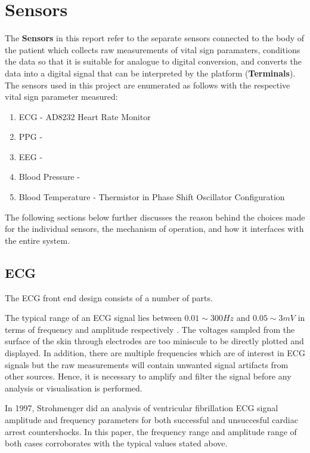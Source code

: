 \chapter{Sensors} 
\label{sensors}

The {\bf Sensors} in this report refer to the separate sensors connected to the body of the patient which collects raw measurements of vital sign paramaters, conditions the data so that it is suitable for analogue to digital conversion, and converts the data into a digital signal that can be interpreted by the platform ({\bf Terminals}). \\

The sensors used in this project are enumerated as follows with the respective vital sign parameter measured: 

\begin{enumerate}
	\item ECG - AD8232 Heart Rate Monitor 
	\item PPG - 
	\item EEG - 
	\item Blood Pressure - 
	\item Blood Temperature - Thermistor in Phase Shift Oscillator Configuration
\end{enumerate}

The following sections below further discusses the reason behind the choices made for the individual sensors, the mechanism of operation, and how it interfaces with the entire system. 

\section{ECG}

The ECG front end design consists of a number of parts. 

The typical range of an ECG signal lies between $0.01\sim 300Hz$ and $0.05\sim 3mV$ in terms of frequency and amplitude respectively \cite{nisignalamplitude}. The voltages sampled from the surface of the skin through electrodes are too miniscule to be directly plotted and displayed. In addition, there are multiple frequencies which are of interest in ECG signals but the raw measurements will contain unwanted signal artifacts from other sources. Hence, it is necessary to amplify and filter the signal before any analysis or visualisation is performed.  

In 1997, Strohmenger \cite{strohmenger1997analysis} did an analysis of ventricular fibrillation ECG signal amplitude and frequency parameters for both successful and unsuccesful cardiac arrest countershocks. In this paper, the frequency range and amplitude range of both cases corroborates with the typical values stated above.  



